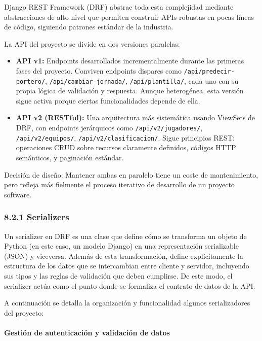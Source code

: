 Django REST Framework (DRF) abstrae toda esta complejidad mediante abstracciones de alto nivel
 que permiten construir APIs robustas en pocas líneas de código, siguiendo patrones estándar
  de la industria.

La API del proyecto se divide en dos versiones paralelas:

\begin{itemize}
\item \textbf{API v1:} Endpoints desarrollados incrementalmente durante las primeras fases del proyecto. Conviven endpoints dispares como \texttt{/api/predecir-portero/}, \texttt{/api/cambiar-jornada/}, \texttt{/api/plantilla/}, cada uno con su propia lógica de validación y respuesta. Aunque heterogénea, esta versión sigue activa porque ciertas funcionalidades depende de ella.

\item \textbf{API v2 (RESTful):} Una arquitectura más sistemática usando ViewSets de DRF, con endpoints jerárquicos como \texttt{/api/v2/jugadores/}, \texttt{/api/v2/equipos/}, \texttt{/api/v2/clasificacion/}. Sigue principios REST: operaciones CRUD sobre recursos claramente definidos, códigos HTTP semánticos, y paginación estándar.
\end{itemize}

Decisión de diseño: Mantener ambas en paralelo tiene un coste de mantenimiento,
 pero refleja más fielmente el proceso iterativo de desarrollo de un proyecto software.

\subsubsection{8.2.1 Serializers}

Un serializer en DRF es una clase que define cómo se transforma un objeto de Python
 (en este caso, un modelo Django) en una representación serializable (JSON) y 
 viceversa. Además de esta transformación, define explícitamente la estructura de
  los datos que se intercambian entre cliente y servidor, incluyendo sus tipos y 
  las reglas de validación que deben cumplirse. De este modo, el serializer actúa
   como el punto donde se formaliza el contrato de datos de la API.

A continuación se detalla la organización y funcionalidad algunos serializadores del proyecto:

\paragraph{Gestión de autenticación y validación de datos}

